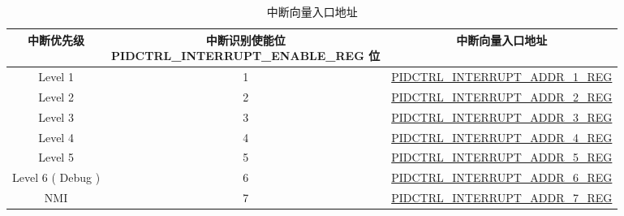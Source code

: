 
\begin{table}[H]
    \centering
    \caption{中断向量入口地址}
    \label{table:Interrupt}
    \begin{tabular}{|*{3}{c|}}
        \hline
        \rowcolor{lightgray}
       中断优先级 &
        \makecell{中断识别使能位\\PIDCTRL\_INTERRUPT\_ENABLE\_REG 位} &
       中断向量入口地址 \\
        \hline
        Level 1 & 1 & \hyperref[regdesc:PIDCTRLINTERRUPTADDR1REG]{PIDCTRL\_INTERRUPT\_ADDR\_1\_REG} \\
        \hline
        Level 2 & 2 &\hyperref[regdesc:PIDCTRLINTERRUPTADDR2REG]{PIDCTRL\_INTERRUPT\_ADDR\_2\_REG}\\
        \hline
        Level 3 & 3 & \hyperref[regdesc:PIDCTRLINTERRUPTADDR3REG]{PIDCTRL\_INTERRUPT\_ADDR\_3\_REG} \\
        \hline
        Level 4 & 4 & \hyperref[regdesc:PIDCTRLINTERRUPTADDR4REG]{PIDCTRL\_INTERRUPT\_ADDR\_4\_REG}\\
        \hline
        Level 5 & 5 & \hyperref[regdesc:PIDCTRLINTERRUPTADDR5REG]{PIDCTRL\_INTERRUPT\_ADDR\_5\_REG} \\
        \hline
        Level 6 ( Debug ) & 6 & \hyperref[regdesc:PIDCTRLINTERRUPTADDR6REG]{PIDCTRL\_INTERRUPT\_ADDR\_6\_REG} \\
        \hline
        NMI & 7 & \hyperref[regdesc:PIDCTRLINTERRUPTADDR7REG]{PIDCTRL\_INTERRUPT\_ADDR\_7\_REG} \\
        \hline
    \end{tabular}
\end{table}
